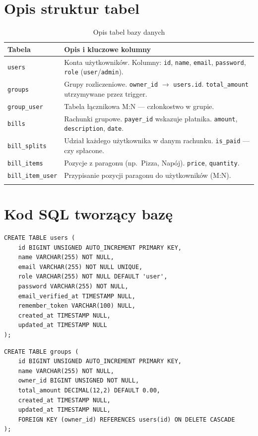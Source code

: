 \documentclass[12pt,a4paper]{report}
\begin{document}
\section{Opis struktur tabel}

\begin{longtable}{@{}p{3.2cm}p{10.5cm}@{}}
\toprule
\textbf{Tabela} & \textbf{Opis i kluczowe kolumny} \\
\midrule
\endhead
\texttt{users} &
Konta u\.zytkownik\'ow. Kolumny: \texttt{id}, \texttt{name}, \texttt{email}, \texttt{password}, \texttt{role} (\texttt{user}/\texttt{admin}). \\
\texttt{groups} &
Grupy rozliczeniowe. \texttt{owner\_id} $\rightarrow$ \texttt{users.id}. \texttt{total\_amount} utrzymywane przez trigger. \\
\texttt{group\_user} &
Tabela \l{}\k{a}cznikowa M:N --- cz\l{}onkostwo w grupie. \\
\texttt{bills} &
Rachunki grupowe. \texttt{payer\_id} wskazuje p\l{}atnika. \texttt{amount}, \texttt{description}, \texttt{date}. \\
\texttt{bill\_splits} &
Udzia\l{} ka\.zdego u\.zytkownika w danym rachunku. \texttt{is\_paid} --- czy sp\l{}acone. \\
\texttt{bill\_items} &
Pozycje z paragonu (np.\ Pizza, Nap\'oj). \texttt{price}, \texttt{quantity}. \\
\texttt{bill\_item\_user} &
Przypisanie pozycji paragonu do u\.zytkownik\'ow (M:N). \\
\bottomrule
\caption{Opis tabel bazy danych}
\end{longtable}

\section{Kod SQL tworz\k{a}cy baz\k{e}}

\begin{lstlisting}[style=sqlstyle, caption={Tabela u\.zytkownik\'ow}]
CREATE TABLE users (
    id BIGINT UNSIGNED AUTO_INCREMENT PRIMARY KEY,
    name VARCHAR(255) NOT NULL,
    email VARCHAR(255) NOT NULL UNIQUE,
    role VARCHAR(255) NOT NULL DEFAULT 'user',
    password VARCHAR(255) NOT NULL,
    email_verified_at TIMESTAMP NULL,
    remember_token VARCHAR(100) NULL,
    created_at TIMESTAMP NULL,
    updated_at TIMESTAMP NULL
);
\end{lstlisting}

\begin{lstlisting}[style=sqlstyle, caption={Grupy rozliczeniowe}]
CREATE TABLE groups (
    id BIGINT UNSIGNED AUTO_INCREMENT PRIMARY KEY,
    name VARCHAR(255) NOT NULL,
    owner_id BIGINT UNSIGNED NOT NULL,
    total_amount DECIMAL(12,2) DEFAULT 0.00,
    created_at TIMESTAMP NULL,
    updated_at TIMESTAMP NULL,
    FOREIGN KEY (owner_id) REFERENCES users(id) ON DELETE CASCADE
);
\end{lstlisting}
\end{document}
